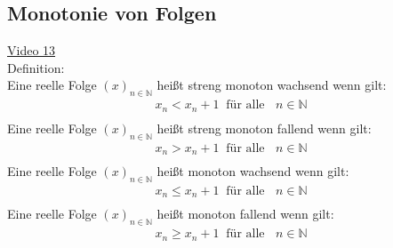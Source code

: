 \subsection{Monotonie von Folgen}
\href{https://youtu.be/W9Xl_hHf18I}{Video 13}\\
Definition:\\
Eine reelle Folge $ (x)_{n\in\mathbb{N}} $ heißt streng monoton wachsend wenn gilt:\\
\begin{align*}
x_n< x_n+1\;\;\text{für alle }\;\; n\in \mathbb{N}\\  
\end{align*}
Eine reelle Folge $ (x)_{n\in\mathbb{N}} $ heißt streng monoton fallend wenn gilt:\\
\begin{align*}
x_n>x_n+1\;\;\text{für alle }\;\; n\in \mathbb{N}\\  
\end{align*}
Eine reelle Folge $ (x)_{n\in\mathbb{N}} $ heißt monoton wachsend wenn gilt:\\
\begin{align*}
x_n\leq x_n+1\;\;\text{für alle }\;\; n\in \mathbb{N}\\  
\end{align*}
Eine reelle Folge $ (x)_{n\in\mathbb{N}} $ heißt  monoton fallend wenn gilt:\\
\begin{align*}
x_n\geq x_n+1\;\;\text{für alle }\;\; n\in \mathbb{N}\\  
\end{align*}
\newpage
\noindent
